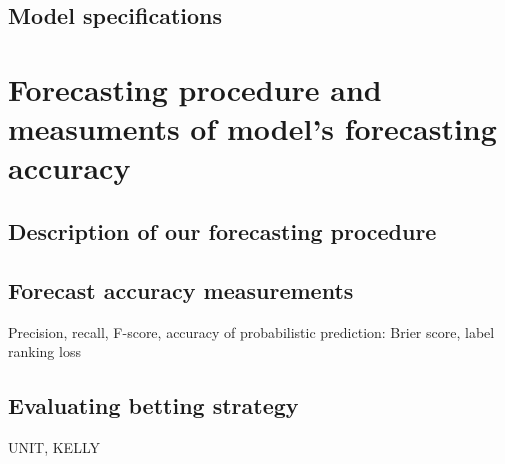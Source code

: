 \subsection{Model specifications}
\section{Forecasting procedure and measuments of model's forecasting accuracy}
\subsection{Description of our forecasting procedure}
\subsection{Forecast accuracy measurements}
Precision, recall, F-score, accuracy of probabilistic prediction: Brier score, label ranking loss
\subsection{Evaluating betting strategy}
UNIT, KELLY




